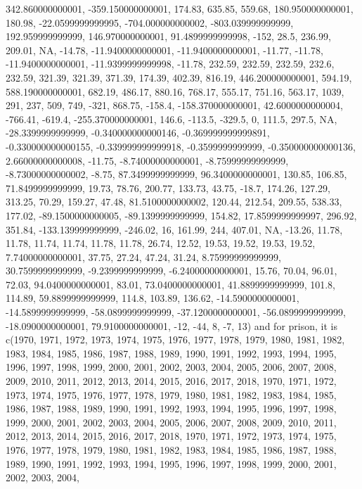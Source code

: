 \documentclass[
]{article}
\begin{document}
342.860000000001, -359.150000000001, 174.83, 635.85, 559.68,
180.950000000001, 180.98, -22.0599999999995, -704.000000000002,
-803.039999999999, 192.959999999999, 146.970000000001, 91.4899999999998,
-152, 28.5, 236.99, 209.01, NA, -14.78, -11.9400000000001,
-11.9400000000001, -11.77, -11.78, -11.9400000000001, -11.9399999999998,
-11.78, 232.59, 232.59, 232.59, 232.6, 232.59, 321.39, 321.39, 371.39,
174.39, 402.39, 816.19, 446.200000000001, 594.19, 588.190000000001,
682.19, 486.17, 880.16, 768.17, 555.17, 751.16, 563.17, 1039, 291, 237,
509, 749, -321, 868.75, -158.4, -158.370000000001, 42.6000000000004,
-766.41, -619.4, -255.370000000001, 146.6, -113.5, -329.5, 0, 111.5,
297.5, NA, -28.3399999999999, -0.340000000000146, -0.369999999999891,
-0.330000000000155, -0.339999999999918, -0.3599999999999,
-0.350000000000136, 2.66000000000008, -11.75, -8.74000000000001,
-8.75999999999999, -8.73000000000002, -8.75, 87.3499999999999,
96.3400000000001, 130.85, 106.85, 71.8499999999999, 19.73, 78.76,
200.77, 133.73, 43.75, -18.7, 174.26, 127.29, 313.25, 70.29, 159.27,
47.48, 81.5100000000002, 120.44, 212.54, 209.55, 538.33, 177.02,
-89.1500000000005, -89.1399999999999, 154.82, 17.8599999999997, 296.92,
351.84, -133.139999999999, -246.02, 16, 161.99, 244, 407.01, NA, -13.26,
11.78, 11.78, 11.74, 11.74, 11.78, 11.78, 26.74, 12.52, 19.53, 19.52,
19.53, 19.52, 7.74000000000001, 37.75, 27.24, 47.24, 31.24,
8.75999999999999, 30.7599999999999, -9.2399999999999, -6.24000000000001,
15.76, 70.04, 96.01, 72.03, 94.0400000000001, 83.01, 73.0400000000001,
41.8899999999999, 101.8, 114.89, 59.8899999999999, 114.8, 103.89,
136.62, -14.5900000000001, -14.5899999999999, -58.0899999999999,
-37.1200000000001, -56.0899999999999, -18.0900000000001,
79.9100000000001, -12, -44, 8, -7, 13) and for prison, it is c(1970,
1971, 1972, 1973, 1974, 1975, 1976, 1977, 1978, 1979, 1980, 1981, 1982,
1983, 1984, 1985, 1986, 1987, 1988, 1989, 1990, 1991, 1992, 1993, 1994,
1995, 1996, 1997, 1998, 1999, 2000, 2001, 2002, 2003, 2004, 2005, 2006,
2007, 2008, 2009, 2010, 2011, 2012, 2013, 2014, 2015, 2016, 2017, 2018,
1970, 1971, 1972, 1973, 1974, 1975, 1976, 1977, 1978, 1979, 1980, 1981,
1982, 1983, 1984, 1985, 1986, 1987, 1988, 1989, 1990, 1991, 1992, 1993,
1994, 1995, 1996, 1997, 1998, 1999, 2000, 2001, 2002, 2003, 2004, 2005,
2006, 2007, 2008, 2009, 2010, 2011, 2012, 2013, 2014, 2015, 2016, 2017,
2018, 1970, 1971, 1972, 1973, 1974, 1975, 1976, 1977, 1978, 1979, 1980,
1981, 1982, 1983, 1984, 1985, 1986, 1987, 1988, 1989, 1990, 1991, 1992,
1993, 1994, 1995, 1996, 1997, 1998, 1999, 2000, 2001, 2002, 2003, 2004,
\end{document}
